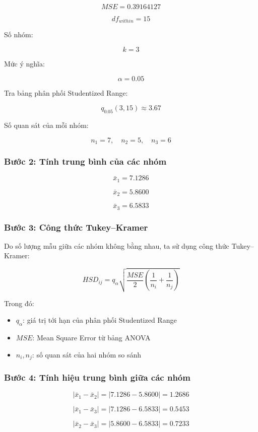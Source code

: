 \[
MSE = 0.39164127
\]

\[
df_{within} = 15
\]

Số nhóm:

\[
k = 3
\]

Mức ý nghĩa:

\[
\alpha = 0.05
\]

Tra bảng phân phối Studentized Range:

\[
q_{0.05}(3,15) \approx 3.67
\]

Số quan sát của mỗi nhóm:

\[
n_1 = 7, \quad n_2 = 5, \quad n_3 = 6
\]

\subsubsection*{Bước 2: Tính trung bình của các nhóm}

\[
\bar{x}_1 = 7.1286
\]

\[
\bar{x}_2 = 5.8600
\]

\[
\bar{x}_3 = 6.5833
\]

\subsubsection*{Bước 3: Công thức Tukey--Kramer}

Do số lượng mẫu giữa các nhóm không bằng nhau, ta sử dụng công thức Tukey--Kramer:

\[
HSD_{ij} =
q_{\alpha}
\sqrt{
\frac{MSE}{2}
\left(
\frac{1}{n_i} + \frac{1}{n_j}
\right)
}
\]

Trong đó:

\begin{itemize}
\item $q_{\alpha}$: giá trị tới hạn của phân phối Studentized Range
\item $MSE$: Mean Square Error từ bảng ANOVA
\item $n_i, n_j$: số quan sát của hai nhóm so sánh
\end{itemize}

\subsubsection*{Bước 4: Tính hiệu trung bình giữa các nhóm}

\[
|\bar{x}_1 - \bar{x}_2| = |7.1286 - 5.8600| = 1.2686
\]

\[
|\bar{x}_1 - \bar{x}_3| = |7.1286 - 6.5833| = 0.5453
\]

\[
|\bar{x}_2 - \bar{x}_3| = |5.8600 - 6.5833| = 0.7233
\]

